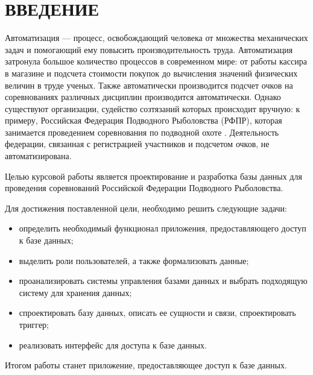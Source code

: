 \section*{ВВЕДЕНИЕ}

Автоматизация --- процесс, освобождающий человека от множества механических задач и помогающий ему повысить производительность труда. Автоматизация затронула большое количество процессов в современном мире: от работы кассира в магазине и подсчета стоимости покупок до вычисления значений физических величин в труде ученых. Также автоматически производится подсчет очков на соревнованиях различных дисциплин производится автоматически. Однако существуют организации, судейство созтязаний которых происходит вручную: к примеру, Российская Федерация Подводного Рыболовства (РФПР), которая занимается проведением соревнования по подводной охоте \cite{rfpr}. Деятельность федерации, связанная с регистрацией участников и подсчетом очков, не автоматизирована.

Целью курсовой работы является проектирование и разработка базы данных для проведения соревнований Российской Федерации Подводного Рыболовства.

Для достижения поставленной цели, необходимо решить следующие задачи:
\begin{itemize}[label=---]
	\item определить необходимый функционал приложения, предоставляющего доступ к базе данных;
	\item выделить роли пользователей, а также формализовать данные;
	\item проанализировать системы управления базами данных и выбрать подходящую систему для хранения данных;
	\item спроектировать базу данных, описать ее сущности и связи, спроектировать триггер;
	\item реализовать интерфейс для доступа к базе данных.
\end{itemize}

Итогом работы станет приложение, предоставляющее доступ к базе данных.
\pagebreak